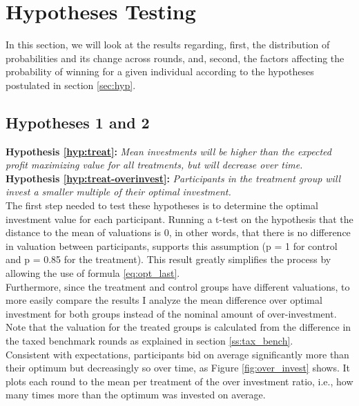 \section{Hypotheses Testing}

In this section, we will look at the results regarding, first, the distribution of probabilities and its change across rounds, and, second, the factors affecting the probability of winning for a given individual according to the hypotheses postulated in section \ref{sec:hyp}.


\subsection{Hypotheses 1 and 2}

\textbf{Hypothesis \ref{hyp:treat}:} \textit{Mean investments will be higher than the expected profit maximizing value for all treatments, but will decrease over time.}\\ 
\textbf{Hypothesis \ref{hyp:treat-overinvest}:} \textit{Participants in the treatment group will invest a smaller multiple of their optimal investment.}\\

The first step needed to test these hypotheses is to determine the optimal investment value for each participant. Running a t-test on the hypothesis that the distance to the mean of valuations is 0, in other words, that there is no difference in valuation between participants, supports this assumption (p = 1 for control and p = 0.85 for the treatment). This result greatly simplifies the process by allowing the use of formula \ref{eq:opt_last}.\\

Furthermore, since the treatment and control groups have different valuations, to more easily compare the results I analyze the mean difference over optimal investment for both groups instead of the nominal amount of over-investment. Note that the valuation for the treated groups is calculated from the difference in the taxed benchmark rounds as explained in section \ref{ss:tax_bench}.\\

Consistent with expectations, participants bid on average significantly more than their optimum but decreasingly so over time, as Figure \ref{fig:over_invest} shows. It plots each round to the mean per treatment of the over investment ratio, i.e., how many times more than the optimum was invested on average.\\

